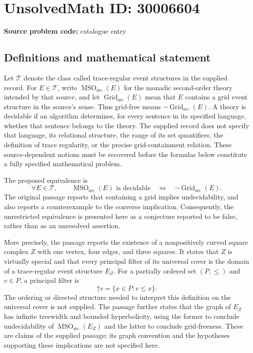 \documentclass[11pt]{article}
\begin{document}
\section*{UnsolvedMath ID: 30006604}
\textbf{Source problem code:} catalogue entry
\subsection{Definitions and mathematical statement}
Let \(\mathcal T\) denote the class called trace-regular event structures in the supplied record. For \(E\in\mathcal T\), write \(\operatorname{MSO}_{\mathrm{src}}(E)\) for the monadic second-order theory intended by that source, and let \(\operatorname{Grid}_{\mathrm{src}}(E)\) mean that \(E\) contains a grid event structure in the source's sense. Thus grid-free means \(\neg\operatorname{Grid}_{\mathrm{src}}(E)\). A theory is decidable if an algorithm determines, for every sentence in its specified language, whether that sentence belongs to the theory. The supplied record does not specify that language, its relational structure, the range of its set quantifiers, the definition of trace regularity, or the precise grid-containment relation. These source-dependent notions must be recovered before the formulas below constitute a fully specified mathematical problem.

The proposed equivalence is
\[
\forall E\in\mathcal T,\qquad
\operatorname{MSO}_{\mathrm{src}}(E)\text{ is decidable}
\quad\Longleftrightarrow\quad
\neg\operatorname{Grid}_{\mathrm{src}}(E).
\]
The original passage reports that containing a grid implies undecidability, and also reports a counterexample to the converse implication. Consequently, the unrestricted equivalence is presented here as a conjecture reported to be false, rather than as an unresolved assertion.

More precisely, the passage reports the existence of a nonpositively curved square complex \(Z\) with one vertex, four edges, and three squares. It states that \(Z\) is virtually special and that every principal filter of its universal cover is the domain of a trace-regular event structure \(E_Z\). For a partially ordered set \((P,\leq)\) and \(v\in P\), a principal filter is
\[
\mathord{\uparrow}v=\{x\in P:v\leq x\}.
\]
The ordering or directed structure needed to interpret this definition on the universal cover is not supplied. The passage further states that the graph of \(E_Z\) has infinite treewidth and bounded hyperbolicity, using the former to conclude undecidability of \(\operatorname{MSO}_{\mathrm{src}}(E_Z)\) and the latter to conclude grid-freeness. These are claims of the supplied passage; its graph convention and the hypotheses supporting these implications are not specified here.
\end{document}
